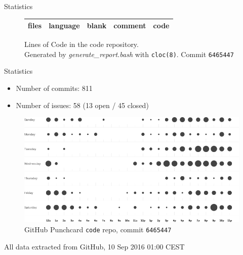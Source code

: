 \documentclass[11pt,aspectratio=169]{beamer}
\begin{document}
    \begin{frame}{Statistics}
        \pause
        \begin{figure}[h]
            \centering
            \begin{tabular}{lllll}
                \toprule
                files  &  language  &  blank  &  comment  &  code \\
                \midrule
                
                \bottomrule
            \end{tabular}
            \caption{Lines of Code in the code repository. \\ Generated by \textit{generate\_report.bash} with \texttt{cloc(8)}. Commit \texttt{6465447}}
        \end{figure}
    \end{frame}
    \begin{frame}{Statistics}
        \pause
        
        \begin{itemize}
            \item Number of commits: 811
            \item Number of issues: 58 (13 open / 45 closed) 
        \end{itemize}
        
        \pause

        \begin{figure}
        \centering
        \includegraphics[width=0.6\linewidth]{assets/gh_punchcard}
        \caption{GitHub Punchcard \texttt{code} repo, commit \texttt{6465447}}
        \label{fig:ghpunchcard}
        \end{figure}
        
        \begin{tiny}
        All data extracted from GitHub, 10 Sep 2016 01:00 CEST 
        \end{tiny}
    
    \end{frame}
\end{document}
